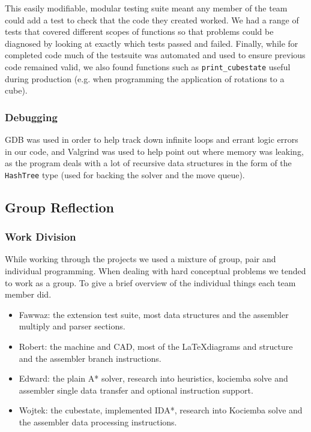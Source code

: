 \documentclass[8pt]{article}
\begin{document}
This easily modifiable, modular testing suite meant any member of the team could add a test to check that the code they created worked.
We had a range of tests that covered different scopes of functions so that problems could be diagnosed by looking at exactly which tests passed and failed.
Finally, while for completed code much of the testsuite was automated and used to ensure previous code remained valid, we also found functions such as 
\texttt{print\_cubestate} useful during production (e.g. when programming the application of rotations to a cube).

\subsubsection{Debugging}

GDB was used in order to help track down infinite loops and errant logic errors in our code, and Valgrind was used to help point out where memory was leaking, as the program deals with a lot of recursive data structures in the form of the \texttt{HashTree} type (used for backing the solver and the move queue).

\subsection{Group Reflection}

\subsubsection{Work Division}

While working through the projects we used a mixture of group, pair and individual
programming. When dealing with hard conceptual problems we tended to work as a 
group. To give a brief overview of the individual things each team member did.
\begin{itemize}
    \item Fawwaz: the extension test suite, most data structures and the assembler multiply and parser sections.
    \item Robert: the machine and CAD, most of the \LaTeX \space diagrams and structure and
    the assembler branch instructions.
    \item Edward: the plain A* solver, research into heuristics, kociemba 
    solve and assembler single data transfer and optional instruction support.
    \item Wojtek: the cubestate, implemented IDA*, research into Kociemba solve and the 
    assembler data processing instructions.
\end{itemize}
\end{document}
